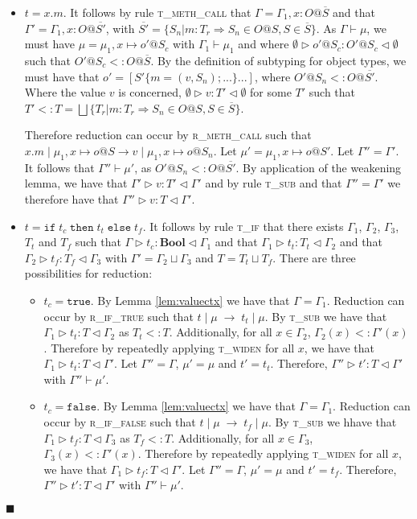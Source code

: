 \documentclass{article}
\newcommand{\lemref}[1]{Lemma \ref{#1}}
\newcommand{\rmethc}{\textsc{r\_meth\_call} }
\newcommand{\riftrue}{\textsc{r\_if\_true} }
\newcommand{\riffalse}{\textsc{r\_if\_false} }
\newcommand{\tif}{\textsc{t\_if} }
\newcommand{\tmethc}{\textsc{t\_meth\_call} }
\newcommand{\tsub}{\textsc{t\_sub} }
\newcommand{\tsubctx}{\textsc{t\_widen} }
\newcommand{\typerule}[4]{#1 \triangleright #2 : #3 \triangleleft #4}
\newcommand{\oprule}[4]{#1 \mid #2\;\longrightarrow\;#3 \mid #4}
\newcommand{\truev}{\mathtt{true}}
\newcommand{\falsev}{\mathtt{false}}
\newcommand{\boolt}{\mathbf{Bool}}
\newcommand{\ift}[3]{\mathtt{if} \; #1 \; \mathtt{then} \; #2 \; \mathtt{else} \; #3}
\newcommand{\qed}{$\blacksquare$}
\newenvironment{proof}{\vspace{1ex}\noindent{\bf Proof}\hspace{0.5em}}
  {\hfill\qed\vspace{1ex}}
\begin{document}
\begin{proof}
\begin{itemize}
\item $t = x.m$. It follows by rule \tmethc that
$\Gamma = \Gamma_1, x : O@\overline{S}$ and that 
$\Gamma' = \Gamma_1, x : O@\overline{S'}$, with
$\overline{S'} = \{ S_n | m : T_r \Rightarrow S_n \in O@S, S \in \overline{S} \}$.
As
$\Gamma \vdash \mu$, we must have $\mu = \mu_1, x \mapsto o'@S_c$ with
$\Gamma_1 \vdash \mu_1$ and where
$\typerule{\emptyset}{o'@S_c}{O'@S_c}{\emptyset}$ such that
$O'@S_c <: O@\overline{S}$. By the definition of subtyping for object types,
we must have that
$o' = [ S' \{ m = (v,S_n) ; ... \} ... ]$, where $O'@S_n <: O@\overline{S'}$. 
Where the value $v$ is concerned, $\typerule{\emptyset}{v}{T'}{\emptyset}$
for some $T'$ such that $T' <: T = \bigsqcup{ \{ T_r | m : T_r \Rightarrow S_n \in O@S, S \in \overline{S} \} }$.

Therefore reduction can occur by \rmethc such that
$x.m \mid \mu_1, x \mapsto o@S \longrightarrow v \mid \mu_1, x \mapsto o@S_n$.
Let $\mu' = \mu_1, x \mapsto o@S'$. Let $\Gamma'' = \Gamma'$. It follows that
$\Gamma'' \vdash \mu'$, as $O'@S_n <: O@\overline{S'}$. 
By application of the weakening lemma, we have that
$\typerule{\Gamma'}{v}{T'}{\Gamma'}$ and by rule \tsub and that
$\Gamma'' = \Gamma'$ we therefore have that 
$\typerule{\Gamma''}{v}{T}{\Gamma'}$.

\item $t = \ift{t_c}{t_t}{t_f}$. It follows by rule \tif that there exists
$\Gamma_1$, $\Gamma_2$, $\Gamma_3$, $T_t$ and $T_f$ such that
$\typerule{\Gamma}{t_c}{\boolt}{\Gamma_1}$ and that
$\typerule{\Gamma_1}{t_t}{T_t}{\Gamma_2}$ and that
$\typerule{\Gamma_2}{t_f}{T_f}{\Gamma_3}$ with
$\Gamma' = \Gamma_2 \sqcup \Gamma_3$ and $T = T_t \sqcup T_f$. There are
three possibilities for reduction:

	\begin{itemize}
	\item $t_c = \truev$. By \lemref{lem:valuectx} we have that
	$\Gamma = \Gamma_1$. Reduction can occur by \riftrue such that
	$\oprule{t}{\mu}{t_t}{\mu}$. By \tsub we have that
	$\typerule{\Gamma_1}{t_t}{T}{\Gamma_2}$ as $T_t <: T$. Additionally, for
	all $x \in \Gamma_2$, $\Gamma_2(x) <: \Gamma'(x)$. Therefore by
	repeatedly applying \tsubctx for all $x$, we have that
	$\typerule{\Gamma_1}{t_t}{T}{\Gamma'}$.
	Let $\Gamma'' = \Gamma$, $\mu' = \mu$ and 
	$t' = t_t$. Therefore, $\typerule{\Gamma''}{t'}{T}{\Gamma'}$ with
	$\Gamma'' \vdash \mu'$.

	\item $t_c = \falsev$. By \lemref{lem:valuectx} we have that
	$\Gamma = \Gamma_1$. Reduction can occur by \riffalse such that
	$\oprule{t}{\mu}{t_f}{\mu}$. By \tsub we hhave that
	$\typerule{\Gamma_1}{t_f}{T}{\Gamma_3}$ as $T_f <: T$. Additionally, for
	all $x \in \Gamma_3$, $\Gamma_3(x) <: \Gamma'(x)$. Therefore by
	repeatedly applying \tsubctx for all $x$, we have that
	$\typerule{\Gamma_1}{t_f}{T}{\Gamma'}$. Let $\Gamma'' = \Gamma$,
	$\mu' = \mu$ and $t' = t_f$. Therefore, 
	$\typerule{\Gamma''}{t'}{T}{\Gamma'}$ with $\Gamma'' \vdash \mu'$.


\end{itemize}
\end{itemize}
\end{proof}
\end{document}
